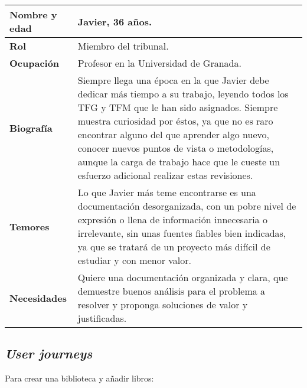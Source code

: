 \begin{table}[H]
    \centering
    \begin{tabularx}{\columnwidth}{|l|X|}
        \hline
        \textbf{Nombre y edad} & Javier, 36 años. \\
        \hline
        \textbf{Rol} & Miembro del tribunal. \\
        \hline
        \textbf{Ocupación} & Profesor en la Universidad de Granada. \\
        \hline
        \textbf{Biografía} & Siempre llega una época en la que Javier debe dedicar más tiempo a su trabajo, leyendo todos los TFG y TFM que le han sido asignados. Siempre muestra curiosidad por éstos, ya que no es raro encontrar alguno del que aprender algo nuevo, conocer nuevos puntos de vista o metodologías, aunque la carga de trabajo hace que le cueste un esfuerzo adicional realizar estas revisiones. \\
        \hline
        \textbf{Temores} & Lo que Javier más teme encontrarse es una documentación desorganizada, con un pobre nivel de expresión o llena de información innecesaria o irrelevante, sin unas fuentes fiables bien indicadas, ya que se tratará de un proyecto más difícil de estudiar y con menor valor. \\
        \hline
        \textbf{Necesidades} & Quiere una documentación organizada y clara, que demuestre buenos análisis para el problema a resolver y proponga soluciones de valor y justificadas. \\
        \hline
    \end{tabularx}
\end{table}

\subsection{\textit{User journeys}}

Para crear una biblioteca y añadir libros:

